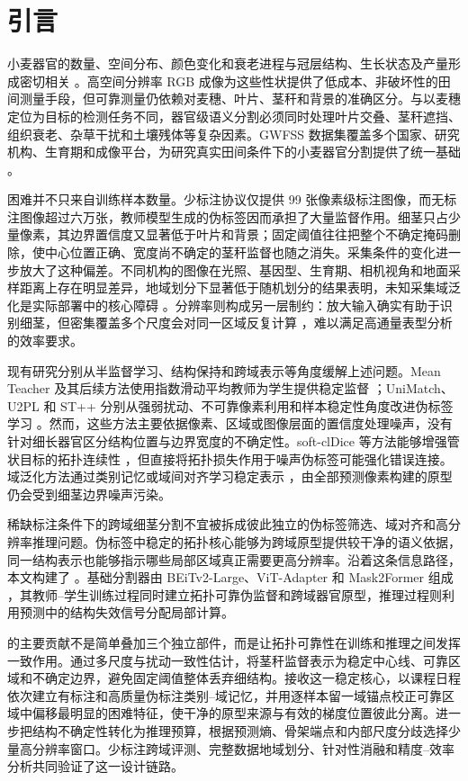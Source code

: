 \section{引言}
\label{sec:introduction}

小麦器官的数量、空间分布、颜色变化和衰老进程与冠层结构、生长状态及产量形成密切相关 \citep{li2021canopy,li2021lai,dandrifosse2022ear}。高空间分辨率 RGB 成像为这些性状提供了低成本、非破坏性的田间测量手段，但可靠测量仍依赖对麦穗、叶片、茎秆和背景的准确区分。与以麦穗定位为目标的检测任务不同，器官级语义分割必须同时处理叶片交叠、茎秆遮挡、组织衰老、杂草干扰和土壤残体等复杂因素。GWFSS 数据集覆盖多个国家、研究机构、生育期和成像平台，为研究真实田间条件下的小麦器官分割提供了统一基础 \citep{wang2025gwfss}。

困难并不只来自训练样本数量。少标注协议仅提供 99 张像素级标注图像，而无标注图像超过六万张，教师模型生成的伪标签因而承担了大量监督作用。细茎只占少量像素，其边界置信度又显著低于叶片和背景；固定阈值往往把整个不确定掩码删除，使中心位置正确、宽度尚不确定的茎秆监督也随之消失。采集条件的变化进一步放大了这种偏差。不同机构的图像在光照、基因型、生育期、相机视角和地面采样距离上存在明显差异，地域划分下显著低于随机划分的结果表明，未知采集域泛化是实际部署中的核心障碍 \citep{wang2025gwfss}。分辨率则构成另一层制约：放大输入确实有助于识别细茎，但密集覆盖多个尺度会对同一区域反复计算 \citep{cao2025detailminority}，难以满足高通量表型分析的效率要求。

现有研究分别从半监督学习、结构保持和跨域表示等角度缓解上述问题。Mean Teacher 及其后续方法使用指数滑动平均教师为学生提供稳定监督 \citep{tarvainen2017mean,berrada2024guided}；UniMatch、U2PL 和 ST++ 分别从强弱扰动、不可靠像素利用和样本稳定性角度改进伪标签学习 \citep{yang2023unimatch,wang2022u2pl,yang2022stpp}。然而，这些方法主要依据像素、区域或图像层面的置信度处理噪声，没有针对细长器官区分结构位置与边界宽度的不确定性。soft-clDice 等方法能够增强管状目标的拓扑连续性 \citep{shit2021cldice}，但直接将拓扑损失作用于噪声伪标签可能强化错误连接。域泛化方法通过类别记忆或域间对齐学习稳定表示 \citep{kim2022pinmemory}，由全部预测像素构建的原型仍会受到细茎边界噪声污染。

稀缺标注条件下的跨域细茎分割不宜被拆成彼此独立的伪标签筛选、域对齐和高分辨率推理问题。伪标签中稳定的拓扑核心能够为跨域原型提供较干净的语义依据，同一结构表示也能够指示哪些局部区域真正需要更高分辨率。沿着这条信息路径，本文构建了 \METHOD。基础分割器由 BEiTv2-Large、ViT-Adapter 和 Mask2Former 组成 \citep{peng2022beitv2,chen2023vitadapter,cheng2022mask2former}，其教师--学生训练过程同时建立拓扑可靠伪监督和跨域器官原型，推理过程则利用预测中的结构失效信号分配局部计算。

\METHOD 的主要贡献不是简单叠加三个独立部件，而是让拓扑可靠性在训练和推理之间发挥一致作用。\TRPL 通过多尺度与扰动一致性估计，将茎秆监督表示为稳定中心线、可靠区域和不确定边界，避免固定阈值整体丢弃细结构。\TCPM 接收这一稳定核心，以课程日程依次建立有标注和高质量伪标注类别--域记忆，并用逐样本留一域锚点校正可靠区域中偏移最明显的困难特征，使干净的原型来源与有效的梯度位置彼此分离。\BAZR 进一步把结构不确定性转化为推理预算，根据预测熵、骨架端点和内部尺度分歧选择少量高分辨率窗口。少标注跨域评测、完整数据地域划分、针对性消融和精度--效率分析共同验证了这一设计链路。

